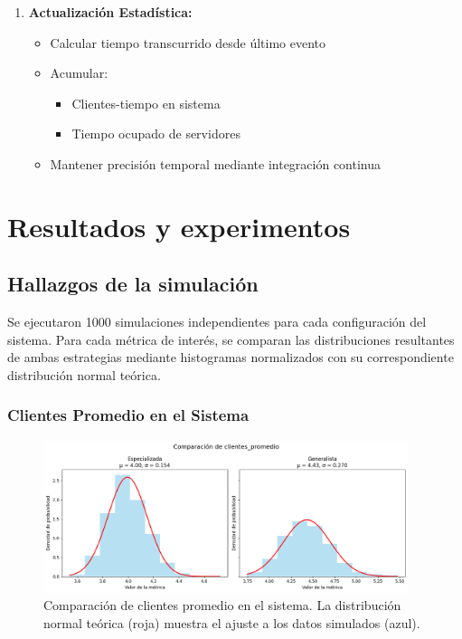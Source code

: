 \documentclass[letterpaper, 12pt]{report}
\begin{document}
\begin{enumerate}[leftmargin=1.5cm]
    \item \textbf{Actualización Estadística:}
    \begin{itemize}
        \item Calcular tiempo transcurrido desde último evento
        \item Acumular:
        \begin{itemize}
            \item Clientes-tiempo en sistema
            \item Tiempo ocupado de servidores
        \end{itemize}
        \item Mantener precisión temporal mediante integración continua
    \end{itemize}
    
\end{enumerate}

\chapter{Resultados y experimentos}

\section{Hallazgos de la simulación}

Se ejecutaron 1000 simulaciones independientes para cada configuración del sistema. Para cada métrica de interés, se comparan las distribuciones resultantes de ambas estrategias mediante histogramas normalizados con su correspondiente distribución normal teórica.

\subsection{Clientes Promedio en el Sistema}
\begin{figure}[H]
    \centering
    \includegraphics[width=0.95\textwidth]{images/avr_clients.png}
    \caption{Comparación de clientes promedio en el sistema. La distribución normal teórica (roja) muestra el ajuste a los datos simulados (azul).}
    \label{fig:clientes}
\end{figure}
\end{document}
